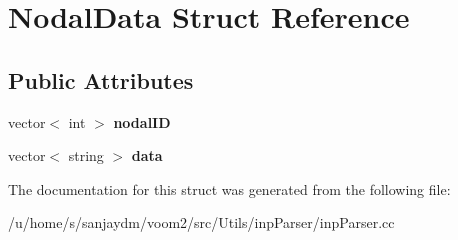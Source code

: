 \hypertarget{struct_nodal_data}{
\section{NodalData Struct Reference}
\label{struct_nodal_data}
}
\subsection*{Public Attributes}
\begin{DoxyCompactItemize}
\item 
\hypertarget{struct_nodal_data_a63f8b2f730e110c222f37356c9954a66}{
vector$<$ int $>$ {\bfseries nodalID}}
\label{struct_nodal_data_a63f8b2f730e110c222f37356c9954a66}

\item 
\hypertarget{struct_nodal_data_afbcf8d70a430b845dcf83c2ba9d04dc7}{
vector$<$ string $>$ {\bfseries data}}
\label{struct_nodal_data_afbcf8d70a430b845dcf83c2ba9d04dc7}

\end{DoxyCompactItemize}


The documentation for this struct was generated from the following file:\begin{DoxyCompactItemize}
\item 
/u/home/s/sanjaydm/voom2/src/Utils/inpParser/inpParser.cc\end{DoxyCompactItemize}
